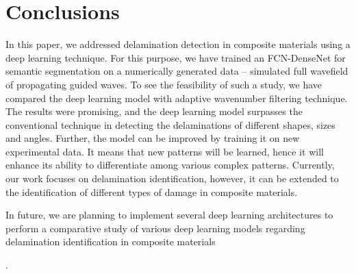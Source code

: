 \section{Conclusions}
In this paper, we addressed delamination detection in composite materials using a deep learning technique. 
For this purpose, we have trained an FCN-DenseNet for semantic segmentation on a numerically generated data -- simulated full wavefield of propagating guided waves.
To see the feasibility of such a study, we have compared the deep learning model with adaptive wavenumber filtering technique.
The results were promising, and the deep learning model surpasses the conventional technique in detecting the delaminations of different shapes, sizes and angles. 
Further, the model can be improved by training it on new experimental data.
It means that new patterns will be learned, hence it will enhance its ability to differentiate among various complex patterns.
Currently, our work focuses on delamination identification, however, it can be extended to the identification of different types of damage in composite materials.

\DIFaddbegin {}

\DIFaddend In future, we are planning to implement several deep learning architectures to perform a comparative study of various deep learning models regarding delamination identification in composite materials\DIFaddbegin {}

\DIFaddend .